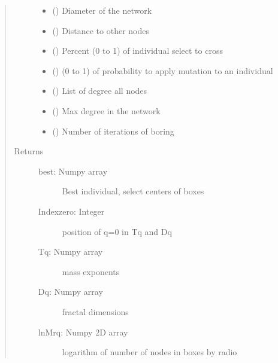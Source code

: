 \documentclass[letterpaper,10pt,english]{sphinxmanual}
\begin{document}
\begin{fulllineitems}
\begin{quote}
\begin{description}
\begin{itemize}
\item {} 
 () \textendash{} Diameter of the network

\item {} 
 () \textendash{} Distance to other nodes

\item {} 
 () \textendash{} Percent (0 to 1) of individual select to cross

\item {} 
 () \textendash{} (0 to 1) of probability to apply mutation to an individual

\item {} 
 () \textendash{} List of degree all nodes

\item {} 
 () \textendash{} Max degree in the network

\item {} 
 () \textendash{} Number of iterations of boring

\end{itemize}

\item[{Returns}] \leavevmode
\begin{description}
\item[{best: Numpy array}] \leavevmode
Best individual, select centers of boxes

\item[{Indexzero: Integer}] \leavevmode
position of q=0 in Tq and Dq

\item[{Tq: Numpy array}] \leavevmode
mass exponents

\item[{Dq: Numpy array}] \leavevmode
fractal dimensions

\item[{lnMrq: Numpy 2D array}] \leavevmode
logarithm of number of nodes in boxes by radio


\end{description}
\end{description}
\end{quote}
\end{fulllineitems}
\end{document}
